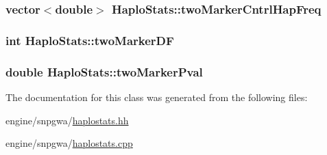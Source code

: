 \label{classHaploStats_a0a4928ebe077029a82a13fcdb10910c7}
\hypertarget{classHaploStats_a68d73b06d601fa5809b051f8458a2a23}{
\subsubsection[{twoMarkerCntrlHapFreq}]{\setlength{\rightskip}{0pt plus 5cm}vector$<$double$>$ {\bf HaploStats::twoMarkerCntrlHapFreq}}}
\label{classHaploStats_a68d73b06d601fa5809b051f8458a2a23}
\hypertarget{classHaploStats_a9cfc39f1d2348301cad42b3a4b600229}{
\subsubsection[{twoMarkerDF}]{\setlength{\rightskip}{0pt plus 5cm}int {\bf HaploStats::twoMarkerDF}}}
\label{classHaploStats_a9cfc39f1d2348301cad42b3a4b600229}
\hypertarget{classHaploStats_ae385ebf05af0fa4d0199f4ffa8fd6c74}{
\subsubsection[{twoMarkerPval}]{\setlength{\rightskip}{0pt plus 5cm}double {\bf HaploStats::twoMarkerPval}}}
\label{classHaploStats_ae385ebf05af0fa4d0199f4ffa8fd6c74}


The documentation for this class was generated from the following files:\begin{DoxyCompactItemize}
\item 
engine/snpgwa/\hyperlink{haplostats_8hh}{haplostats.hh}\item 
engine/snpgwa/\hyperlink{haplostats_8cpp}{haplostats.cpp}\end{DoxyCompactItemize}
